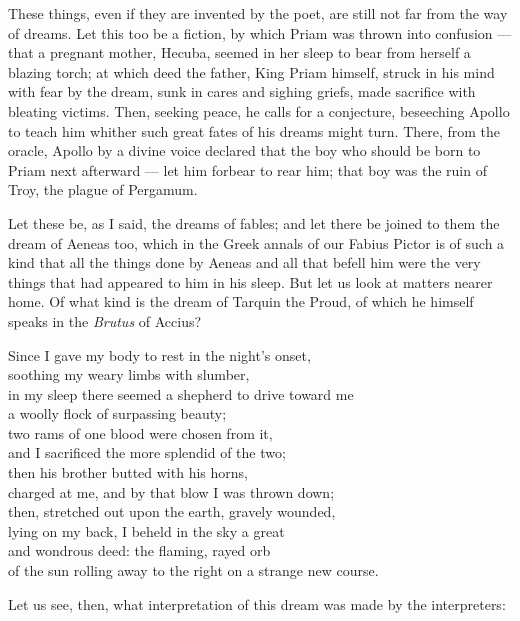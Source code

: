  These things, even if they are invented by the poet, are still not far from the way of dreams. Let this too be a fiction, by which Priam was thrown into confusion — that a pregnant mother, Hecuba, seemed in her sleep to bear from herself a blazing torch; at which deed the father, King Priam himself, struck in his mind with fear by the dream, sunk in cares and sighing griefs, made sacrifice with bleating victims. Then, seeking peace, he calls for a conjecture, beseeching Apollo to teach him whither such great fates of his dreams might turn. There, from the oracle, Apollo by a divine voice declared that the boy who should be born to Priam next afterward — let him forbear to rear him; that boy was the ruin of Troy, the plague of Pergamum.

 Let these be, as I said, the dreams of fables; and let there be joined to them the dream of Aeneas too, which in the Greek annals of our Fabius Pictor is of such a kind that all the things done by Aeneas and all that befell him were the very things that had appeared to him in his sleep. But let us look at matters nearer home. Of what kind is the dream of Tarquin the Proud, of which he himself speaks in the \textit{Brutus} of Accius?

 Since I gave my body to rest in the night's onset, \\
soothing my weary limbs with slumber, \\
in my sleep there seemed a shepherd to drive toward me \\
a woolly flock of surpassing beauty; \\
two rams of one blood were chosen from it, \\
and I sacrificed the more splendid of the two; \\
then his brother butted with his horns, \\
charged at me, and by that blow I was thrown down; \\
then, stretched out upon the earth, gravely wounded, \\
lying on my back, I beheld in the sky a great \\
and wondrous deed: the flaming, rayed orb \\
of the sun rolling away to the right on a strange new course.

Let us see, then, what interpretation of this dream was made by the interpreters:

